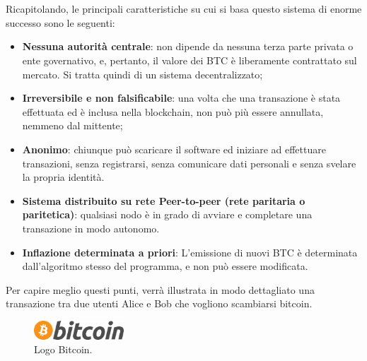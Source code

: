 \\
\\Ricapitolando, le principali caratteristiche su cui si basa questo sistema di enorme successo sono le seguenti:
\begin{itemize}
\item \textbf{Nessuna autorità centrale}: non dipende da nessuna terza parte privata o ente governativo, e, pertanto, il valore dei BTC è liberamente contrattato sul mercato. Si tratta quindi di un sistema decentralizzato;
\item \textbf{Irreversibile e non falsificabile}: una volta che una transazione è stata effettuata ed è inclusa nella blockchain, non può più essere annullata, nemmeno dal mittente;
\item \textbf{Anonimo}: chiunque può scaricare il software ed iniziare ad effettuare transazioni, senza registrarsi, senza comunicare dati personali e senza svelare la propria identità.
\item \textbf{Sistema distribuito su rete Peer-to-peer (rete paritaria o paritetica)}: qualsiasi nodo è in grado di avviare e completare una transazione in modo autonomo.
\item \textbf{Inflazione determinata a priori}: L’emissione di nuovi BTC è determinata dall’algoritmo stesso del programma, e non può essere modificata.
\end{itemize}
Per capire meglio questi punti, verrà illustrata in modo dettagliato una transazione tra due utenti Alice e Bob che vogliono scambiarsi bitcoin.

\begin{figure}[H]
	\centering
	\includegraphics[width=0.3\textwidth]{images/bitcoinLogo.png}
	\caption{Logo Bitcoin.}
	\label{fig:bitcoinLogo}
\end{figure}

